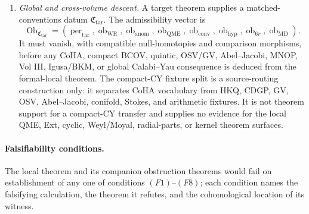 \begin{enumerate}
  \item \emph{Global and cross-volume descent.}
  A target theorem supplies a matched-conventions datum
  \(\mathfrak C_{\mathrm{tar}}\).  The admissibility vector is
  \[
    \operatorname{Ob}_{\mathfrak C_{\mathrm{tar}}}
    =
	    (\operatorname{per}_{\mathrm{tar}},
	     \operatorname{ob}_{\mathrm{WR}},
	     \operatorname{ob}_{\mathrm{anom}},
	     \operatorname{ob}_{\mathrm{QME}},
	     \operatorname{ob}_{\mathrm{conv}},
	     \operatorname{ob}_{\mathrm{hyp}},
	     \operatorname{ob}_{6r},
	     \operatorname{ob}_{\mathrm{MD}}).
  \]
  It must vanish, with compatible null-homotopies and comparison
  morphisms, before any CoHA, compact BCOV, quintic, OSV/GV,
  Abel--Jacobi, MNOP, Vol III, Igusa/BKM, or global Calabi--Yau
  consequence is deduced from the formal-local theorem.  The compact-CY
  fixture split is a source-routing construction only: it separates CoHA
  vocabulary from HKQ, CDGP, GV, OSV, Abel--Jacobi, conifold, Stokes, and
  arithmetic fixtures.  It is not theorem support for a compact-CY
  transfer and supplies no evidence for the local QME, Ext, cyclic,
  Weyl/Moyal, radial-parts, or kernel theorem surfaces.
\end{enumerate}

\medskip
\paragraph{Falsifiability conditions.}
The local theorem and its companion obstruction theorems would fail
on establishment of any one of conditions \((F1)\)--\((F8)\); each
condition names the falsifying calculation, the theorem it refutes,
and the cohomological location of its witness.

